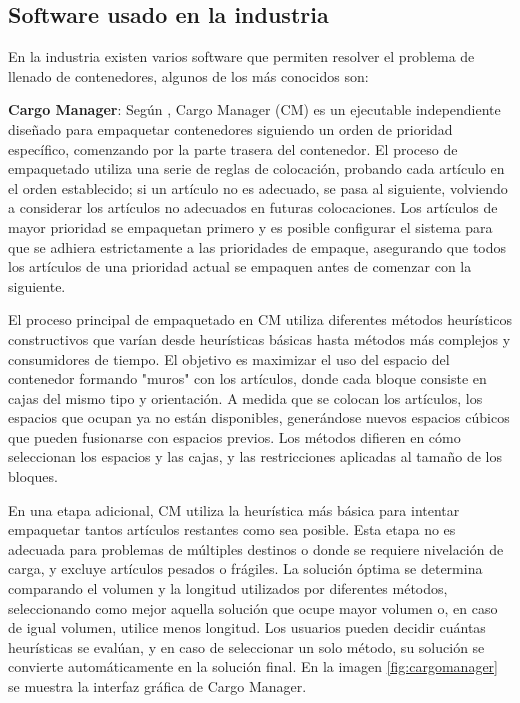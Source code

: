 \subsection{Software usado en la industria}

En la industria existen varios software que permiten resolver el problema de llenado de contenedores, algunos de los más conocidos son:

\textbf{Cargo Manager}: Según \textcite{zhao2017three}, Cargo Manager (CM) es un ejecutable independiente diseñado para empaquetar contenedores siguiendo un orden de prioridad específico, comenzando por la parte trasera del contenedor. El proceso de empaquetado utiliza una serie de reglas de colocación, probando cada artículo en el orden establecido; si un artículo no es adecuado, se pasa al siguiente, volviendo a considerar los artículos no adecuados en futuras colocaciones. Los artículos de mayor prioridad se empaquetan primero y es posible configurar el sistema para que se adhiera estrictamente a las prioridades de empaque, asegurando que todos los artículos de una prioridad actual se empaquen antes de comenzar con la siguiente.

El proceso principal de empaquetado en CM utiliza diferentes métodos heurísticos constructivos que varían desde heurísticas básicas hasta métodos más complejos y consumidores de tiempo. El objetivo es maximizar el uso del espacio del contenedor formando "muros" con los artículos, donde cada bloque consiste en cajas del mismo tipo y orientación. A medida que se colocan los artículos, los espacios que ocupan ya no están disponibles, generándose nuevos espacios cúbicos que pueden fusionarse con espacios previos. Los métodos difieren en cómo seleccionan los espacios y las cajas, y las restricciones aplicadas al tamaño de los bloques.

En una etapa adicional, CM utiliza la heurística más básica para intentar empaquetar tantos artículos restantes como sea posible. Esta etapa no es adecuada para problemas de múltiples destinos o donde se requiere nivelación de carga, y excluye artículos pesados o frágiles. La solución óptima se determina comparando el volumen y la longitud utilizados por diferentes métodos, seleccionando como mejor aquella solución que ocupe mayor volumen o, en caso de igual volumen, utilice menos longitud. Los usuarios pueden decidir cuántas heurísticas se evalúan, y en caso de seleccionar un solo método, su solución se convierte automáticamente en la solución final. En la imagen \ref{fig:cargomanager} se muestra la interfaz gráfica de Cargo Manager.

